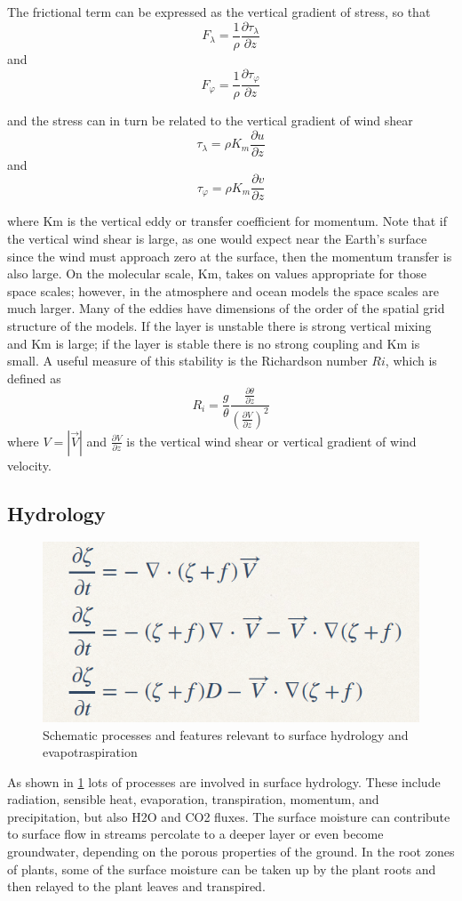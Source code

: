 The frictional term can be expressed as the vertical gradient of stress, so that $$F_\lambda = \frac{1}{\rho} \frac{\partial \tau_\lambda}{\partial z}$$
and $$F_\varphi = \frac{1}{\rho} \frac{\partial \tau_\varphi}{\partial z}$$


and the stress can in turn be related to the vertical gradient of wind shear
$$\tau_\lambda = \rho K_m \frac{\partial u}{\partial z}$$
and $$\tau_\varphi = \rho K_m \frac{\partial v}{\partial z}$$

where Km is the vertical eddy or transfer coefficient for momentum. Note that if the vertical wind shear is large, as one would expect near the Earth's surface since the wind must approach zero at the surface, then the momentum transfer is also large. On the molecular scale, Km, takes on values appropriate for those space scales; however, in the atmosphere and ocean models the space scales are much larger. Many of the eddies have dimensions of the order of the spatial grid structure of the models.
If the layer is unstable there is strong vertical mixing and Km is large; if the layer is stable there is no strong coupling and Km is small. A useful measure of this stability is the Richardson number $Ri$, which is defined as
$$R_i = \frac{g}{\theta} \frac{\frac{\partial \theta}{\partial z}}{\left( \frac{\partial V}{\partial z} \right)^2}$$
where $V = \left| \vec{V} \right|$ and $\frac{\partial V}{\partial z}$ is the vertical wind shear or vertical gradient of wind velocity.

\subsection{Hydrology}
\begin{figure}[htp!]
    \centering
    \includegraphics[width=0.5\linewidth]{uploads/15image.png}
    \caption{Schematic processes and features relevant to surface hydrology and evapotraspiration}
    \label{fig: fig 2}
\end{figure}
As shown in \ref{fig: fig 2} lots of processes are involved in surface hydrology. These include radiation, sensible heat, evaporation, transpiration, momentum, and precipitation, but also H2O and CO2 fluxes. The surface moisture can contribute to surface flow in streams percolate to a deeper layer or even become groundwater, depending on the porous properties of the ground. In the root zones of plants, some of the surface moisture can be taken up by the plant roots and then relayed to the plant leaves and transpired.

